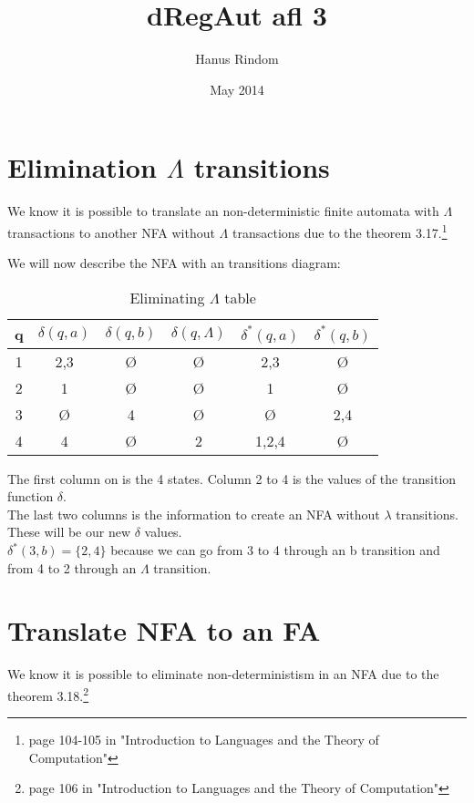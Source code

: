 \documentclass{article}
\title{dRegAut afl 3}
\author{Hanus Rindom}
\date{May 2014}
\begin{document}
\maketitle

\section{Elimination $\Lambda$ transitions}
We know it is possible to translate an non-deterministic finite automata with $\Lambda$ transactions to another NFA without $\Lambda$ transactions due to the theorem 3.17.\footnote{page 104-105 in "Introduction to Languages and the Theory of Computation"}

We will now describe the NFA with an transitions diagram:

\begin{table}[h]
    \begin{tabular}{ c | c c c | c c }
        q & $ \delta (q,a)  $ & $ \delta (q,b) $ & $ \delta (q, \Lambda ) $ & $ \delta ^{*} (q,a) $ & $ \delta ^{*} (q,b) $ \\
            \hline
        1 & {2,3} & Ø & Ø & {2,3} & Ø \\
        2 & {1} & Ø & Ø & {1} & Ø \\
        3 & Ø & {4} & Ø & Ø  & {2,4} \\
        4 & {4} & Ø & {2} & {1,2,4} & Ø \\
    \end{tabular}
\caption{Eliminating $\Lambda$ table}
\label{table:LambdaTable}
\end{table}
The first column on is the 4 states. Column 2 to 4 is the values of the transition function $ \delta $.\\
The last two columns is the information to create an NFA without $ \lambda $ transitions. These will be our new $ \delta $ values.\\
$ \delta^{*} (3,b) = \{ 2,4 \}  $ because we can go from 3 to 4 through an b transition and from 4 to 2 through an $ \Lambda $ transition.\\
    
    

\section{Translate NFA to an FA}
We know it is possible to eliminate non-deterministism in an NFA due to the theorem 3.18.\footnote{page 106 in "Introduction to Languages and the Theory of Computation"}
\end{document}
